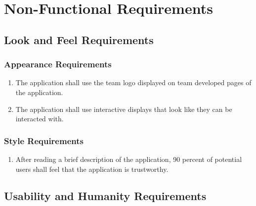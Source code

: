 \documentclass[titlepage]{article}
\newcounter{myCounter}
\begin{document}
\section{Non-Functional Requirements}
\label{sec:non-functional_requirements}
\subsection{Look and Feel Requirements}
\label{sub:look_and_feel_requirements}
\setcounter{myCounter}{0}

\subsubsection{Appearance Requirements}
\label{ssub:appearance_requirements}
\begin{enumerate}[{LF}1. ]
    \setcounter{enumi}{\themyCounter}
    \item The application shall use the team logo displayed on team developed pages of the
    application. 
    \item The application shall use interactive displays that look like they can be interacted with.
    \setcounter{myCounter}{\theenumi}
\end{enumerate}

\subsubsection{Style Requirements}
\label{ssub:style_requirements}
\begin{enumerate}[{LF}1. ]
    \setcounter{enumi}{\themyCounter}
    \item After reading a brief description of the application, 90 percent of potential users shall
    feel that the application is trustworthy.
\end{enumerate}


\subsection{Usability and Humanity Requirements}
\label{sub:usability_and_humanity_requirements}
\setcounter{myCounter}{0}
\end{document}
